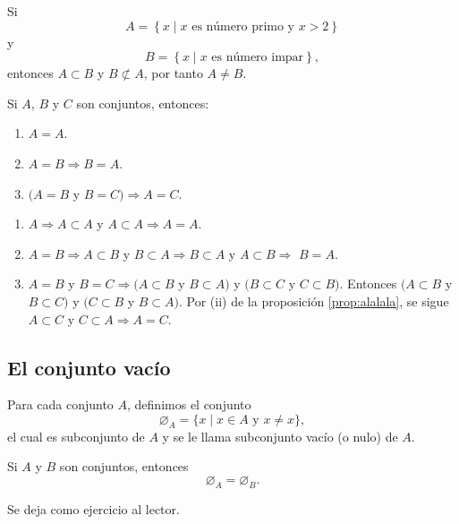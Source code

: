 \begin{examplebox}{}{}
    Si
    $$A = \left\{ x \mid x \text{ es número primo y } x>2 \right\}$$
    y
    $$B = \left\{ x \mid x \text{ es número impar} \right\},$$
    entonces $A \subset B$ y $B \not\subset A$, por tanto $A \neq B$.
\end{examplebox}

\begin{prop}{}{}
    Si $A$, $B$ y $C$ son conjuntos, entonces:
    \begin{enumerate}[label=\roman*., topsep=6pt, itemsep=0pt]
        \item $A = A$.
        \item $A = B \Longrightarrow B = A$.
        \item $(A = B$ y $B = C) \Longrightarrow A = C$.
    \end{enumerate}
    \tcblower
    \demostracion
    \begin{enumerate}[label=\roman*., topsep=6pt, itemsep=0pt]
        \item $A \Longrightarrow A \subset A$ y $A \subset A \Longrightarrow A=A$.
        \item $A=B \Longrightarrow A \subset B$ y $B \subset A \Longrightarrow B \subset A$ y $A \subset B \Longrightarrow$ $B=A$.
        \item $A=B$ y $B=C \Longrightarrow(A \subset B$ y $B \subset A)$ y $(B \subset C$ y $C \subset B)$. Entonces $(A \subset B$ y $B \subset C)$ y $(C \subset B$ y $B \subset A)$. Por (ii) de la proposición \ref{prop:alalala}, se sigue $A \subset C$ y $C \subset A \Longrightarrow A=C$.
    \end{enumerate}
\end{prop}

\subsection{El conjunto vacío}

\begin{definicion}{}{}
    Para cada conjunto $A$, definimos el conjunto
    $$\varnothing_A = \{x \mid x \in A \text { y } x \neq x\},$$
    el cual es subconjunto de $A$ y se le llama subconjunto vacío (o nulo) de $A$.
\end{definicion}

\begin{prop}{}{}
    Si $A$ y $B$ son conjuntos, entonces
    $$\varnothing_A = \varnothing_B.$$

    \tcblower
    \demostracion Se deja como ejercicio al lector.
\end{prop}

